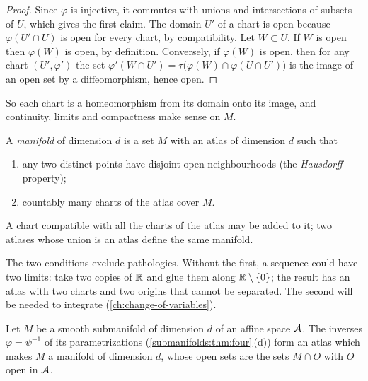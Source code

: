 \begin{notechapter}
\begin{proof}
Since $\varphi$ is injective, it commutes with unions and intersections
of subsets of $U$, which gives the first claim. The domain $U'$ of a
chart is open because $\varphi(U'\cap U)$ is open for every chart, by
compatibility. Let $W\subset U$. If $W$ is open then $\varphi(W)$ is
open, by definition. Conversely, if $\varphi(W)$ is open, then for any
chart $(U', \varphi')$ the set
$\varphi'(W\cap U') = \tau\bigl(\varphi(W)\cap\varphi(U\cap U')\bigr)$
is the image of an open set by a diffeomorphism, hence open.
\end{proof}

So each chart is a homeomorphism from its domain onto its image, and
continuity, limits and compactness make sense on $M$.

\begin{definition}[Manifold]\label{tangent-bundles:def:manifold}
A \emph{manifold} of dimension $d$ is a set $M$ with an atlas of
dimension $d$ such that
\begin{enumerate}[nosep]
  \item any two distinct points have disjoint open neighbourhoods (the
        \emph{Hausdorff} property);
  \item countably many charts of the atlas cover $M$.
\end{enumerate}
A chart compatible with all the charts of the atlas may be added to it;
two atlases whose union is an atlas define the same manifold.
\end{definition}

The two conditions exclude pathologies. Without the first, a sequence
could have two limits: take two copies of $\mathbb{R}$ and glue them along
$\mathbb{R}\setminus\{0\}$; the result has an atlas with two charts and two
origins that cannot be separated. The second will be needed to integrate
(\cref{ch:change-of-variables}).

\begin{proposition}
\label{tangent-bundles:prop:submanifold}
Let $M$ be a smooth submanifold of dimension $d$ of an affine space
$\mathcal{A}$. The inverses $\varphi = \psi^{-1}$ of its parametrizations
(\cref{submanifolds:thm:four}\,(d)) form an atlas which makes $M$ a
manifold of dimension $d$, whose open sets are the sets $M\cap O$ with
$O$ open in $\mathcal{A}$.
\end{proposition}


\end{notechapter}
